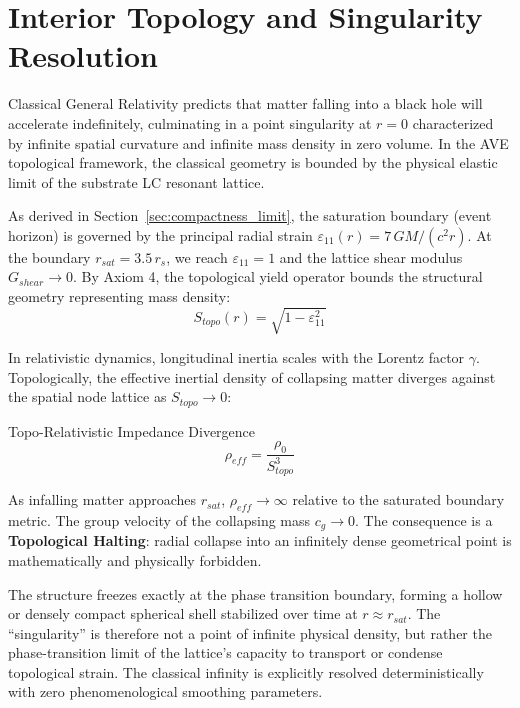 \section{Interior Topology and Singularity Resolution}
\label{sec:interior_topology}

Classical General Relativity predicts that matter falling into a black hole will accelerate indefinitely, culminating in a point singularity at $r = 0$ characterized by infinite spatial curvature and infinite mass density in zero volume. In the AVE topological framework, the classical geometry is bounded by the physical elastic limit of the substrate LC resonant lattice.

As derived in Section~\ref{sec:compactness_limit}, the saturation boundary (event horizon) is governed by the principal radial strain $\varepsilon_{11}(r) = 7\,GM/(c^2 r)$. At the boundary $r_{sat} = 3.5\,r_s$, we reach $\varepsilon_{11} = 1$ and the lattice shear modulus $G_{shear} \to 0$. By Axiom 4, the topological yield operator bounds the structural geometry representing mass density:
\begin{equation}
    S_{topo}(r) = \sqrt{1 - \varepsilon_{11}^2}
\end{equation}

In relativistic dynamics, longitudinal inertia scales with the Lorentz factor $\gamma$. Topologically, the effective inertial density of collapsing matter diverges against the spatial node lattice as $S_{topo} \to 0$:
\begin{resultbox}{Topo-Relativistic Impedance Divergence}
\begin{equation}
    \rho_{eff} = \frac{\rho_0}{S_{topo}^3}
\end{equation}
\end{resultbox}

As infalling matter approaches $r_{sat}$, $\rho_{eff} \to \infty$ relative to the saturated boundary metric. The group velocity of the collapsing mass $c_g \to 0$. The consequence is a \textbf{Topological Halting}: radial collapse into an infinitely dense geometrical point is mathematically and physically forbidden. 

The structure freezes exactly at the phase transition boundary, forming a hollow or densely compact spherical shell stabilized over time at $r \approx r_{sat}$. The ``singularity'' is therefore not a point of infinite physical density, but rather the phase-transition limit of the lattice's capacity to transport or condense topological strain. The classical infinity is explicitly resolved deterministically with zero phenomenological smoothing parameters.


